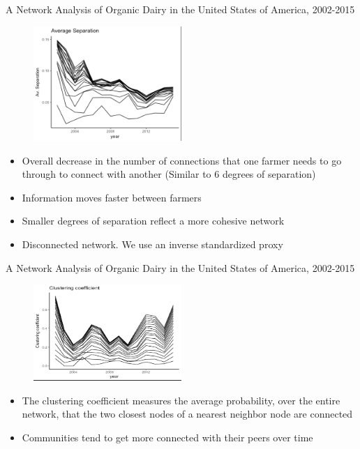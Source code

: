 \documentclass[20]{beamer}
\begin{document}
\begin{frame}{A Network Analysis of Organic Dairy in the United States of America, 2002-2015}
\begin{figure}
   \vspace{-1mm}
   \includegraphics[width=0.5\textwidth]{av_separation.png}
\end{figure}
\vspace{-5mm}
\begin{itemize}
\item Overall decrease in the number of connections that one farmer needs to go through to connect with another (Similar to 6 degrees of separation) 
\item Information moves faster between farmers
\item Smaller degrees of separation reflect a more cohesive network
\item Disconnected network. We use an inverse standardized proxy

\end{itemize}
\end{frame}


\begin{frame}{A Network Analysis of Organic Dairy in the United States of America, 2002-2015}
\begin{figure}
   \vspace{-1mm}
   \includegraphics[width=0.5\textwidth]{clustering_coefficient.png}
\end{figure}
\vspace{-5mm}
\begin{itemize}
\item The clustering coefficient measures the average probability, over the entire network, that the two closest nodes of a nearest neighbor node are connected 
\item  Communities tend to get more connected with their peers over time
\end{itemize}
\end{frame}
\end{document}
